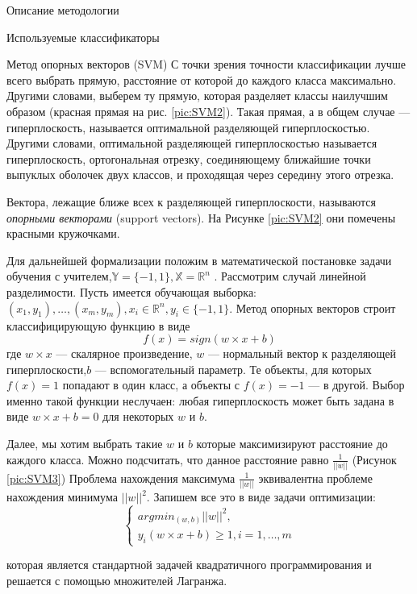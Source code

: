 \begin{section}{Описание методологии}
\begin{subsection}{Используемые классификаторы}
\begin{subsubsection}{Метод опорных векторов (SVM)}
С точки зрения точности классификации лучше всего выбрать прямую, расстояние от которой до каждого класса максимально. Другими словами, выберем ту прямую, которая разделяет классы наилучшим образом (красная прямая на рис. \ref{pic:SVM2}). Такая прямая, а в общем случае — гиперплоскость, называется оптимальной разделяющей гиперплоскостью.
Другими словами, оптимальной разделяющей гиперплоскостью называется гиперплоскость, ортогональная отрезку, соединяющему ближайшие точки выпуклых оболочек двух классов, и проходящая через середину этого отрезка.

Вектора, лежащие ближе всех к разделяющей гиперплоскости, называются \textit{опорными векторами} (support vectors). На Рисунке \ref{pic:SVM2} они помечены красными кружочками.

Для дальнейшей формализации положим в математической постановке задачи обучения с учителем,$\mathbb{Y} = \{-1,1\}, \mathbb{X} = \mathbb{R}^n$ .
Рассмотрим случай линейной разделимости. Пусть имеется обучающая выборка: $(x_1,y_1 ),…,(x_m,y_m ),x_i \in \mathbb{R}^n,y_i \in \{-1,1\}$.
Метод опорных векторов строит классифицирующую функцию  в виде
\begin{equation}
  f(x)=sign (w \times x + b)
\end{equation}
где $w \times x$ — скалярное произведение, $w$  — нормальный вектор к разделяющей гиперплоскости,$b$  — вспомогательный параметр. Те объекты, для которых $f(x) = 1$ попадают в один класс, а объекты с $f(x) = -1$ — в другой. Выбор именно такой функции неслучаен: любая гиперплоскость может быть задана в виде $w \times x + b = 0$ для некоторых $w$ и $b$.

Далее, мы хотим выбрать такие $w$ и $b$ которые максимизируют расстояние до каждого класса. Можно подсчитать, что данное расстояние равно $\frac{1}{||w||}$ (Рисунок \ref{pic:SVM3}) Проблема нахождения максимума $\frac{1}{||w||}$ эквивалентна проблеме нахождения минимума $||w||^2$. Запишем все это в виде задачи оптимизации:
\begin{equation}
  \begin{cases} arg⁡min_{(w,b)⁡} ||w||^2 , \\ y_i (w \times x+b) \geq 1, i=1,…,m \end{cases}
\end{equation}


которая является стандартной задачей квадратичного программирования и решается с помощью множителей Лагранжа.


\end{subsubsection}
\end{subsection}
\end{section}
